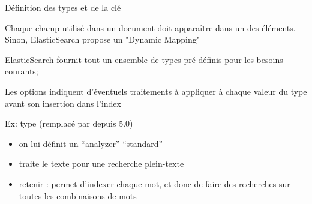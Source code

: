 \begin{frame}{Définition des types et de la clé}

Chaque champ utilisé dans un document doit apparaître dans un
des éléments. Sinon, ElasticSearch propose un
      "Dynamic Mapping"
      
      \vfill
   ElasticSearch fournit tout un ensemble de types pré-définis pour      
      les besoins courants; 

\vfill

Les options indiquent d'éventuels traitements à appliquer                      
 à chaque valeur du type avant son insertion dans l'index
 
 \vfill
 
 \begin{blocgauche}
Ex: type  (remplacé par  depuis 5.0)
      \begin{itemize}
        \item on lui définit un ``analyzer''  ``standard''
        \item traite le texte pour une recherche
          plein-texte
        \item retenir :  permet d'indexer chaque  mot, et donc de faire
          des recherches sur toutes les combinaisons de mots
      \end{itemize}
\end{blocgauche}

\end{frame}



